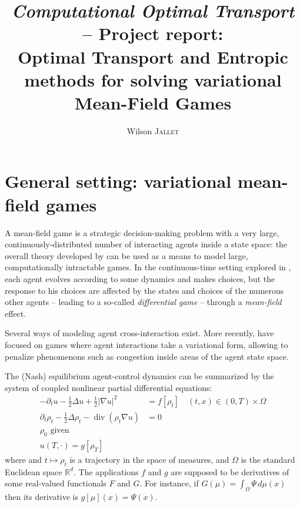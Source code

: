 \documentclass{article}
\author{Wilson \textsc{Jallet}}
\title{
{\large\textit{Computational Optimal Transport} -- \textsf{Project report:}}\\
Optimal Transport and Entropic methods for solving variational Mean-Field Games}
\newcommand{\RR}{\mathbb{R}}
\DeclareMathOperator{\divg}{div}
\begin{document}
\maketitle


\section{General setting: variational mean-field games}

A mean-field game \cite{LASRY2006619,LASRY2006679} is a strategic decision-making problem with a very large, continuously-distributed number of interacting agents inside a state space: the overall theory developed by \citeauthor{LASRY2006619} can be used as a means to model large, computationally intractable games. In the continuous-time setting explored in \cite{LASRY2006679}, each agent evolves according to some dynamics and makes choices, but the response to his choices are affected by the states and choices of the numerous other agents -- leading to a so-called \textit{differential game} -- through a \textit{mean-field} effect.

Several ways of modeling agent cross-interaction exist. More recently, \cite{benamou:hal-01295299} have focused on games where agent interactions take a variational form, allowing to penalize phenomenons such as congestion inside areas of the agent state space.


The (Nash) equilibrium agent-control dynamics can be summarized by the system of coupled nonlinear partial differential equations:
\begin{subequations}\label{eq:VariationalQuadraticMFG}
\begin{align}\label{eq:VarQuadMFGHJB}
-\partial_t u - \frac{1}{2}\Delta u + \frac12|\nabla u|^2 &= f[\rho_t] \quad (t,x) \in  (0, T) \times \Omega \\\label{eq:VarQuadMFGKolmo}
\partial_t \rho_t - \frac{1}{2}\Delta\rho_t - \divg(\rho_t \nabla u) &= 0 \\
\rho_0 \text{ given} \\
u(T, \cdot) = g[\rho_T]
\end{align}	
\end{subequations}
where and $t\mapsto \rho_t$ is a trajectory in the space of measures, and $\Omega$ is the standard Euclidean space $\RR^d$. The applications $f$ and $g$ are supposed to be derivatives of some real-valued functionals $F$ and $G$. For instance, if $G(\mu) = \int_\Omega \Psi\,d\mu(x)$ then its derivative is $g[\mu](x) = \Psi(x)$.
\end{document}
